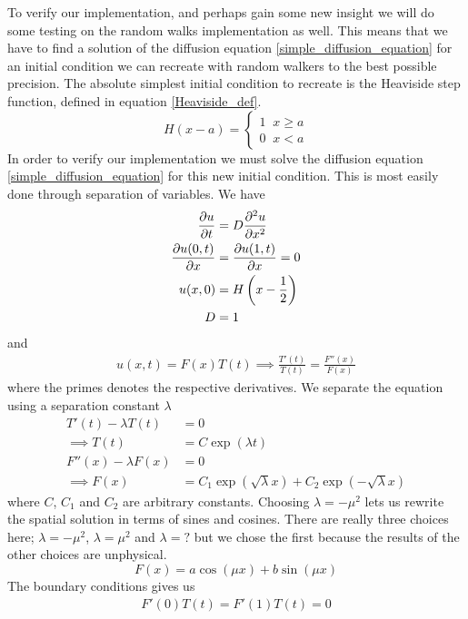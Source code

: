 To verify our implementation, and perhaps gain some new insight we will do some testing on the random walks implementation as well. 
This means that we have to find a solution of the diffusion equation \eqref{simple_diffusion_equation} for an initial condition we can recreate with random walkers to the best possible precision. 
The absolute simplest initial condition to recreate is the Heaviside step function, defined in equation \eqref{Heaviside_def}. 
\begin{equation}\label{Heaviside_def}
 H(x-a) = \begin{cases}
           1\;\;x\geq a\\
           0\;\;x<a
          \end{cases}
\end{equation}
In order to verify our implementation we must solve the diffusion equation \eqref{simple_diffusion_equation} for this new initial condition. 
This is most easily done through separation of variables. We have
\begin{align}
 \frac{\partial u}{\partial t} &= D\frac{\partial^2 u}{\partial x^2}\\
 \frac{\partial u(0,t)}{\partial x} &= \frac{\partial u(1,t)}{\partial x} = 0 \\
 u(x,0) &= H\left(x-\frac{1}{2}\right)\\
 D &= 1
\end{align}
and
\begin{align*}
 u(x,t) = F(x)T(t) \implies \frac{T'(t)}{T(t)} = \frac{F''(x)}{F(x)}
\end{align*}
where the primes denotes the respective derivatives. We separate the equation using a separation constant $\lambda$
\begin{align*}
 T'(t)-\lambda T(t) &= 0 \\
 \implies T(t) &= C\exp(\lambda t)\\
 F''(x) -\lambda F(x) &= 0 \\
 \implies F(x) &= C_1\exp(\sqrt{\lambda}x) + C_2\exp(-\sqrt{\lambda}x)
\end{align*}
where $C$, $C_1$ and $C_2$ are arbitrary constants. 
Choosing $\lambda = -\mu^2$ lets us rewrite the spatial solution in terms of sines and cosines. 
There are really three choices here; $\lambda = -\mu^2$, $\lambda = \mu^2$ and $\lambda = ?$ but we chose the first because the results of the other choices are unphysical.
\begin{equation*}
 F(x) = a\cos(\mu x) + b\sin(\mu x)
\end{equation*}
The boundary conditions gives us 
\begin{align*}
 F'(0)T(t) = F'(1)T(t) = 0
\end{align*}
